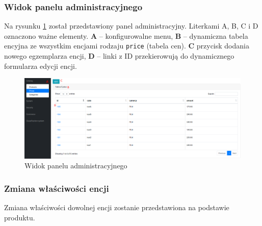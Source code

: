 \subsubsection{Widok panelu administracyjnego}
Na rysunku \ref{scr_adminmain} został przedstawiony panel administracyjny. Literkami A, B, C i D oznaczono ważne elementy. \textbf{A} -- konfigurowalne menu, \textbf{B} -- dynamiczna tabela encyjna ze wszystkim encjami rodzaju \texttt{price} (tabela cen). \textbf{C} przycisk dodania nowego egzemplarza encji, \textbf{D} -- linki z ID przekierowują do dynamicznego formularza edycji encji. 
\begin{figure}[h]
	\begin{center}
		\includegraphics[width=1\textwidth]{admin-main.png}
	\end{center}
	\caption{{\color{black}Widok panelu administracyjnego}} \label{scr_adminmain}
\end{figure}


\subsubsection{Zmiana właściwości encji} 
Zmiana właściwości dowolnej encji zostanie przedstawiona na podstawie produktu.
 
